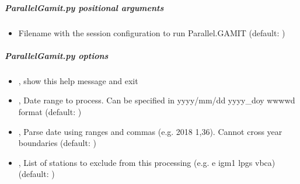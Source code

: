 \documentclass[letterpaper,10pt,english]{sphinxmanual}
\begin{document}
\subparagraph{ParallelGamit.py positional arguments}
\label{\detokenize{pgamit.com:ParallelGamit.py-positional-arguments}}\begin{itemize}
\item {} 
\sphinxAtStartPar
{\hyperref[\detokenize{pgamit.com:ParallelGamit.py-session.cfg}]{}} \sphinxhyphen{} Filename with the session configuration to run Parallel.GAMIT (default: )

\end{itemize}


\subparagraph{ParallelGamit.py options}
\label{\detokenize{pgamit.com:ParallelGamit.py-options}}\begin{itemize}
\item {} 
\sphinxAtStartPar
{\hyperref[\detokenize{pgamit.com:ParallelGamit.py--h}]{}}, {\hyperref[\detokenize{pgamit.com:ParallelGamit.py---help}]{}} \sphinxhyphen{} show this help message and exit

\item {} 
\sphinxAtStartPar
{\hyperref[\detokenize{pgamit.com:ParallelGamit.py--d}]{}} , {\hyperref[\detokenize{pgamit.com:ParallelGamit.py---date}]{}}  \sphinxhyphen{} Date range to process. Can be specified in yyyy/mm/dd yyyy\_doy wwww\sphinxhyphen{}d format (default: )

\item {} 
\sphinxAtStartPar
{\hyperref[\detokenize{pgamit.com:ParallelGamit.py--dp}]{}} , {\hyperref[\detokenize{pgamit.com:ParallelGamit.py---date_parser}]{}}  \sphinxhyphen{} Parse date using ranges and commas (e.g. 2018 1,3\sphinxhyphen{}6). Cannot cross year boundaries (default: )

\item {} 
\sphinxAtStartPar
{\hyperref[\detokenize{pgamit.com:ParallelGamit.py--e}]{}} , {\hyperref[\detokenize{pgamit.com:ParallelGamit.py---exclude}]{}}  \sphinxhyphen{} List of stations to exclude from this processing (e.g. \sphinxhyphen{}e igm1 lpgs vbca) (default: )


\end{itemize}
\end{document}
